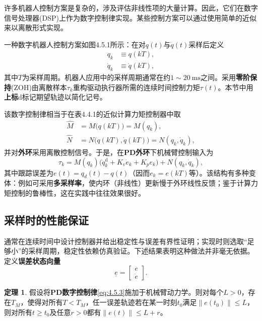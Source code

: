 \documentclass[UTF8]{ctexart}
\theoremstyle{definition}
\newtheorem{theorem}{定理}[section]
\begin{document}
许多机器人控制方案是复杂的，涉及评估非线性项的大量计算。因此，它们在数字信号处理器(DSP)上作为数字控制律实现。某些控制方案可以通过使用简单的近似来以离散形式实现。

一种数字机器人控制方案如图4.5.1所示：在对$q(t)$与$\dot{q}(t)$采样后定义
\begin{equation}\label{eq:4.5.1}
\begin{aligned}
    q_k &\equiv q(kT), \\
    \dot{q}_k &\equiv \dot{q}(kT),
\end{aligned}
\end{equation}
其中$T$为采样周期。机器人应用中的采样周期通常在约$1\sim20\ \mathrm{ms}$之间。采用\textbf{零阶保持}(ZOH)由离散样本$\tau_k$重构驱动执行器所需的连续时间控制力矩$\tau(t)$。本节中用\textbf{上标$\mathrm{d}$}标记期望轨迹以简化记号。

该数字控制律相当于在表4.4.1的近似计算力矩控制器中取
\begin{equation}\label{eq:4.5.2}
\begin{aligned}
    \hat{M} &= M\bigl(q(kT)\bigr)=M(q_k), \\
    \hat{N} &= N\bigl(q(kT),\dot{q}(kT)\bigr)=N(q_k,\dot{q}_k),
\end{aligned}
\end{equation}
并对\textbf{外环}采用离散控制信号。于是，在\textbf{PD外环}下机械臂控制输入为
\begin{equation}\label{eq:4.5.3}
    \tau_k = M(q_k)\bigl(\ddot{q}_k^{\mathrm{d}} + K_v\dot{e}_k + K_pe_k\bigr) + N(q_k,\dot{q}_k),
\end{equation}
其中跟踪误差为$e(t)=q_d(t)-q(t)$（因而$e_k=e(kT)$等）。该结构有多种变体：例如可采用\textbf{多采样率}，使内环（非线性）更新慢于外环线性反馈；鉴于计算力矩控制的鲁棒性，这在实践中往往效果很好。

\subsection{采样时的性能保证}

通常在连续时间中设计控制器并给出稳定性与误差有界性证明；实现时则选取``足够小''的采样周期，稳定性依赖仿真验证。下述结果表明这种做法并非毫无依据。定义\textbf{误差状态向量}
\begin{equation*}
    \underline{e}=\begin{bmatrix} e \\ \dot{e} \end{bmatrix}.
\end{equation*}

\begin{theorem}
假设将\textbf{PD数字控制律}\eqref{eq:4.5.3}施加于机械臂动力学。则对每个$L>0$，存在$T_M$，使得对所有$T<T_M$，任一误差轨迹若在某一时刻$t_0$满足$\|e(t_0)\|\le L$，则对所有$t\ge t_0$及任意$r>0$都有$\|e(t)\|\le L+r$。
\end{theorem}
\end{document}
